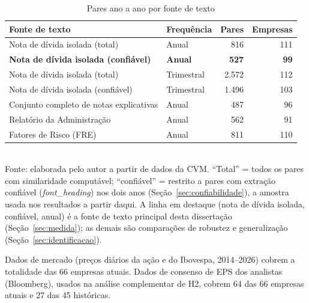 \documentclass[a4paper,12pt]{report}
\begin{document}
\begin{table}[htbp]
    \centering
    \caption{Pares ano a ano por fonte de texto}
    \label{tab:sample}
    \begin{tabular}{@{}llrr@{}}
        \toprule
        \textbf{Fonte de texto} & \textbf{Frequência} & \textbf{Pares} & \textbf{Empresas} \\
        \midrule
        Nota de dívida isolada (total)      & Anual & 816 & 111 \\
        \rowcolor{fontechave}
        \textbf{Nota de dívida isolada (confiável)}  & \textbf{Anual} & \textbf{527} & \textbf{99} \\
        Nota de dívida isolada (total)      & Trimestral & 2.572 & 112 \\
        Nota de dívida isolada (confiável)  & Trimestral & 1.496 & 103 \\
        Conjunto completo de notas explicativas & Anual & 487 & 96 \\
        Relatório da Administração & Anual & 562 & 91 \\
        Fatores de Risco (FRE) & Anual & 811 & 110 \\
        \bottomrule
    \end{tabular}
    \\[0.3cm]
    {\footnotesize Fonte: elaborada pelo autor a partir de dados da CVM. ``Total'' = todos os pares com similaridade computável; ``confiável'' = restrito a pares com extração confiável (\textit{font\_heading}) nos dois anos (Seção~\ref{sec:confiabilidade}), a amostra usada nos resultados a partir daqui. A linha em destaque (nota de dívida isolada, confiável, anual) é a fonte de texto principal desta dissertação (Seção~\ref{sec:medida}); as demais são comparações de robustez e generalização (Seção~\ref{sec:identificacao}).}
\end{table}

Dados de mercado (preços diários da ação e do Ibovespa, 2014--2026) cobrem a totalidade das 66 empresas atuais. Dados de consenso de EPS dos analistas (Bloomberg), usados na análise complementar de H2, cobrem 64 das 66 empresas atuais e 27 das 45 históricas.
\end{document}
